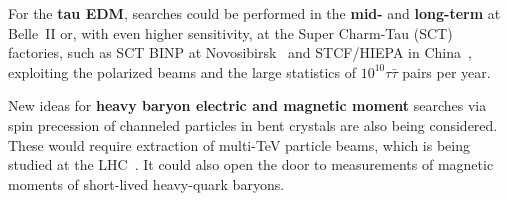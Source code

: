 For the {\bf tau EDM}, searches could be performed in the {\bf mid-} and {\bf long-term} at Belle~II or, with even  higher sensitivity,  at the Super Charm-Tau (SCT) factories, such as SCT BINP at Novosibirsk~\cite{Bondar:2013cja,Novosibirsk_SCT_input} and STCF/HIEPA in China~\cite{Luo:2018njj,Peng:2018}, 
exploiting the polarized beams and the large statistics of $10^{10} \tau \bar \tau$ pairs per year.


New ideas for {\bf heavy baryon electric and magnetic moment} searches  via spin precession of channeled particles in bent crystals are also being considered. 
These would require extraction of multi-TeV particle beams, which is being studied at
the LHC~\cite{Baryshevsky:2019vou, Mazzolari:2018hsu}. It could also open the door to measurements of magnetic moments of short-lived heavy-quark baryons. 


